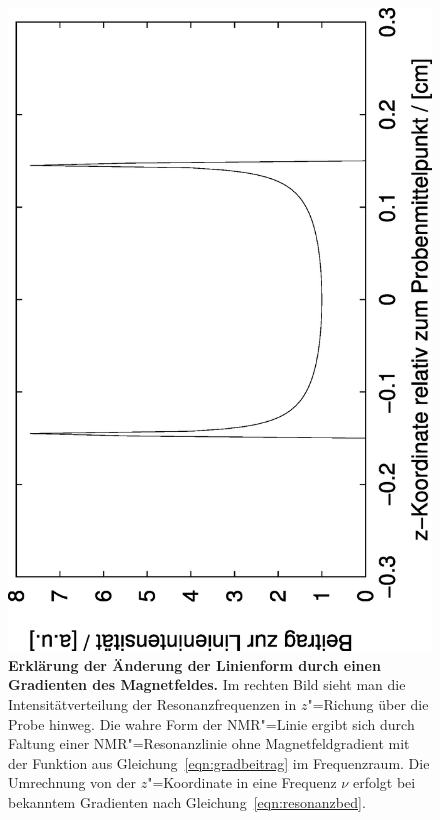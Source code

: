 \begin{figure}[htp]
\begin{center}
{			\parbox[c]{0.9\smallwidth}{\centering\includegraphics[angle=-90,width=0.9\smallwidth]{plots/gradlinform}}}
	\end{center}
	\caption[Erklärung der Änderung der Linienform durch einen Gradienten des
		Magnetfeldes]{{\upshape\bfseries Erklärung der Änderung der Linienform durch einen Gradienten des
		Magnetfeldes.} Im rechten Bild sieht man die Intensitätverteilung der Resonanzfrequenzen
		in $z$"=Richung über die Probe hinweg. Die wahre Form der NMR"=Linie ergibt sich durch
		Faltung einer NMR"=Resonanzlinie ohne Magnetfeldgradient mit der Funktion aus
		Gleichung~\eqref{eqn:gradbeitrag} im Frequenzraum. Die Umrechnung von der $z$"=Koordinate
		in eine Frequenz $\nu$ erfolgt bei bekanntem Gradienten nach Gleichung~\eqref{eqn:resonanzbed}. }
	\label{fig:gradlinform}
\end{figure}

